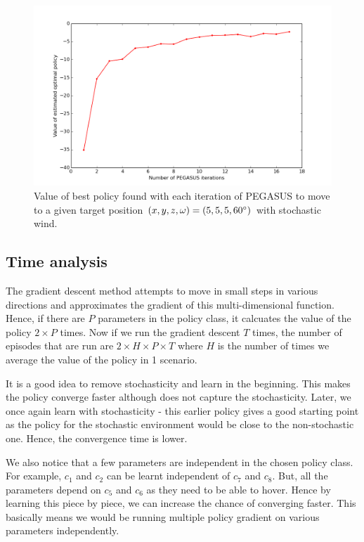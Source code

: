\documentclass[hidelinks,BTech]{iitmdiss}
\begin{document}
\begin{figure}[H]
  \centering
    \includegraphics[width=\textwidth]{quadrotor_position_control_time.png}
    \caption{Value of best policy found with each iteration of PEGASUS to move to a given target position $(x, y, z, \omega) = (5, 5, 5, 60\protect^{\circ})$ with stochastic wind.}
\end{figure}

\subsection{Time analysis}

The gradient descent method attempts to move in small steps in various directions and approximates the gradient of this multi-dimensional function. Hence, if there are $P$ parameters in the policy class, it calcuates the value of the policy $2 \times P$ times. Now if we run the gradient descent $T$ times, the number of episodes that are run are $2 \times H \times P \times T$ where $H$ is the number of times we average the value of the policy in 1 scenario.

It is a good idea to remove stochasticity and learn in the beginning. This makes the policy converge faster although does not capture the stochasticity. Later, we once again learn with stochasticity - this earlier policy gives a good starting point as the policy for the stochastic environment would be close to the non-stochastic one. Hence, the convergence time is lower.

We also notice that a few parameters are independent in the chosen policy class. For example, $c_1$ and $c_2$ can be learnt independent of $c_7$ and $c_8$. But, all the parameters depend on $c_5$ and $c_6$ as they need to be able to hover. Hence by learning this piece by piece, we can increase the chance of converging faster. This basically means we would be running multiple policy gradient on various parameters independently.
\end{document}
